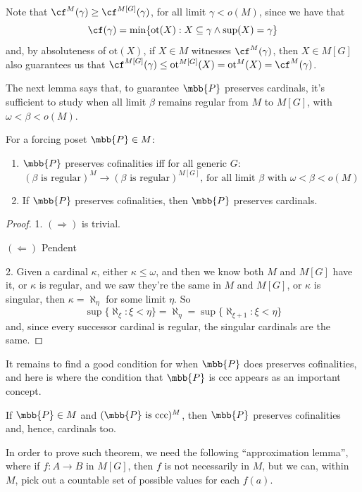 Note that $\cf^M(\gamma)\geq\cf^{M[G]}(\gamma)$, for all limit $\gamma<o(M)$, since we have that
$$\cf(\gamma)=\min\{\text{ot}(X):X\subseteq\gamma\wedge\sup(X)=\gamma\}$$
and, by absoluteness of $\text{ot}(X)$, if $X\in M$ witnesses $\cf^M(\gamma)$, then $X\in M[G]$ also guarantees us that $\cf^{M[G]}(\gamma)\leq\text{ot}^{M[G]}(X)=\text{ot}^M(X)=\cf^M(\gamma)$.

The next lemma says that, to guarantee $\mbb{P}$ preserves cardinals, it's sufficient to study when all limit $\beta$ remains regular from $M$ to $M[G]$, with $\omega<\beta<o(M)$.

\begin{lemma}{}{}
    For a forcing poset $\mbb{P}\in M$:
    \begin{enumerate}
        \item $\mbb{P}$ preserves cofinalities iff for all generic $G$:
        $$(\beta\text{ is regular})^M\to(\beta\text{ is regular})^{M[G]}\text{, for all limit }\beta\text{ with }\omega<\beta<o(M)$$
        \item If $\mbb{P}$ preserves cofinalities, then $\mbb{P}$ preserves cardinals.
    \end{enumerate}
\end{lemma}

\begin{proof}
    1. $(\Rightarrow)$ is trivial.

    $(\Leftarrow)$ \textcolor{laser_eyes}{Pendent}

    2. Given a cardinal $\kappa$, either $\kappa\leq\omega$, and then we know both $M$ and $M[G]$ have it, or $\kappa$ is regular, and we saw they're the same in $M$ and $M[G]$, or $\kappa$ is singular, then $\kappa=\aleph_\eta$ for some limit $\eta$. So
    $$\sup\{\aleph_\xi:\xi<\eta\}=\aleph_\eta=\sup\{\aleph_{\xi+1}:\xi<\eta\}$$
    and, since every successor cardinal is regular, the singular cardinals are the same.
\end{proof}

It remains to find a good condition for when $\mbb{P}$ does preserves cofinalities, and here is where the condition that $\mbb{P}$ is ccc appears as an important concept.

\begin{theorem}{}{}\label{ccc->preserve_cardinals}
    If $\mbb{P}\in M$ and $(\mbb{P}\text{ is ccc})^M$, then $\mbb{P}$ preserves cofinalities and, hence, cardinals too.
\end{theorem}

In order to prove such theorem, we need the following ``approximation lemma'', where if $f:A\to B$ in $M[G]$, then $f$ is not necessarily in $M$, but we can, within $M$, pick out a countable set of possible values for each $f(a)$.

